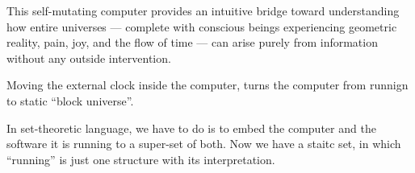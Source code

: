 This self-mutating computer provides an intuitive bridge toward understanding how entire universes --- complete with conscious beings experiencing geometric reality, pain, joy, and the flow of time --- can arise purely from information without any outside intervention.

Moving the external clock inside the computer, turns  the computer from runnign to static ``block universe''.

In set-theoretic language, we have to do is to embed the computer and the software it is running to a super-set of both. Now we have
a staitc set, in which ``running'' is just one structure with its interpretation.


